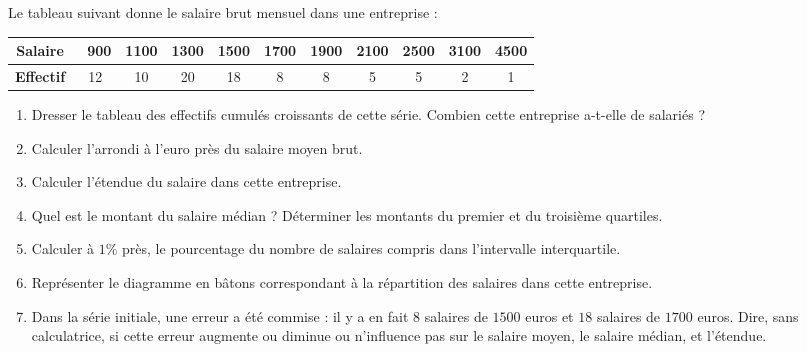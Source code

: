 
\begin{exercice}\label{exoSeconde-0037}

Le tableau suivant donne le salaire brut mensuel dans une entreprise : 
\bigskip

\begin{tabular}{|c||c|c|c|c|c|c|c|c|c|c|}
  \hline 
  \textbf{Salaire} & \ 900&1100&1300&1500&1700&1900&2100&2500&3100&4500\\
  \hline 
  \textbf{Effectif} & 12&10&20&18&8&8&5&5&2&1\\
  \hline
\end{tabular}


\begin{enumerate}
\item Dresser le tableau des effectifs cumulés croissants de cette
  série. Combien cette entreprise a-t-elle de salariés ? 
\item Calculer l'arrondi à l'euro près du salaire moyen brut.

\item Calculer l'étendue du salaire dans cette entreprise.
\item Quel est le montant du salaire médian ? Déterminer les montants
  du premier et du troisième quartiles.
\item Calculer à $1\%$ près, le pourcentage du nombre de salaires
  compris dans l'intervalle interquartile. 

\item Représenter le diagramme en bâtons correspondant à la répartition
  des salaires dans cette entreprise.

\item Dans la série initiale, une erreur a été commise : il y a en
  fait $8$ salaires de $1500$ euros et $18$ salaires de $1700$ euros.
  Dire, sans calculatrice, si cette erreur augmente ou diminue ou n'influence pas  sur le salaire moyen, le salaire médian, et l'étendue.

\end{enumerate}


\end{exercice}
